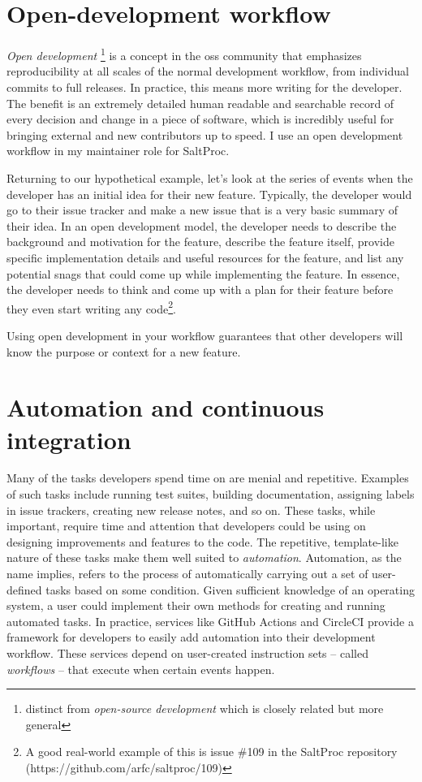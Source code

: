 \documentclass{anstrans}
\begin{document}
\section{Open-development workflow}

    {\it Open development} \footnote{distinct from {\it open-source development} which is closely related but more general}  is a concept in the \Gls{oss} community that emphasizes reproducibility at all scales of the normal development workflow, from individual commits to full releases. In practice, this means more writing for the developer. The benefit is an extremely detailed human readable and searchable record of every decision and change in a piece of software, which is incredibly useful for bringing external and new contributors up to speed. I use an open development workflow in my maintainer role for SaltProc.
    
    Returning to our hypothetical example, let's look at the series of events when the developer has an initial idea for their new feature. Typically, the developer would go to their issue tracker and make a new issue that is a very basic summary of their idea. In an open development model, the developer needs to describe the background and motivation for the feature, describe the feature itself, provide specific implementation details and useful resources for the feature, and list any potential snags that could come up while implementing the feature. In essence, the developer needs to think and come up with a plan for their feature before they even start writing any code\footnote{A good real-world example of this is issue \#109 in the SaltProc repository (https://github.com/arfc/saltproc/109)}.
    
    Using open development in your workflow guarantees that other developers will know the purpose or context for a new feature.
    
\section{Automation and continuous integration}
    Many of the tasks developers spend time on are menial and repetitive. Examples of such tasks include running test suites, building documentation, assigning labels in issue trackers, creating new release notes, and so on. These tasks, while important, require time and attention that developers could be using on designing improvements and features to the code. The repetitive, template-like nature of these tasks make them well suited to {\it automation}. Automation, as the name implies, refers to the process of automatically carrying out a set of user-defined tasks based on some condition. Given sufficient knowledge of an operating system, a user could implement their own methods for creating and running automated tasks. In practice, services like GitHub Actions and CircleCI provide a framework for developers to easily add automation into their development workflow. These services depend on user-created instruction sets -- called {\it workflows} -- that execute when certain events happen.
\end{document}
